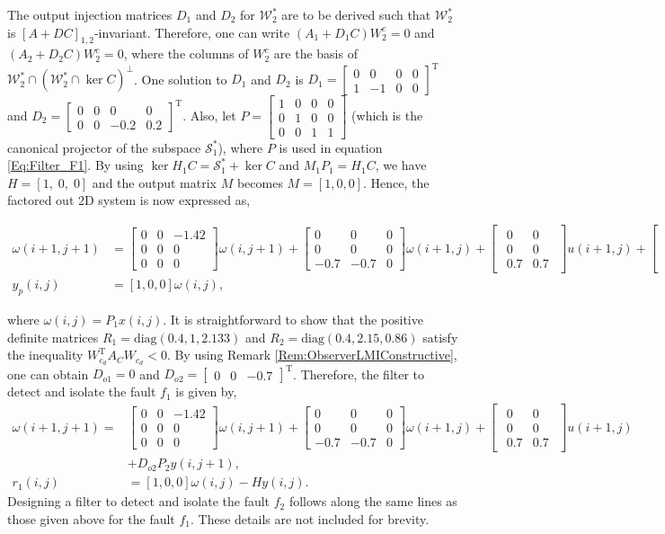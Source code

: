 \documentclass[journal,12pt,draftcls,onecolumn]{IEEEtran}
\newcommand{\tran}{\mathrm{T}}
\newcommand{\bsm}{\begin{smallmatrix}}
\newcommand{\esm}{\end{smallmatrix}}
\newcommand{\bbm}{\begin{bmatrix}}
\newcommand{\ebm}{\end{bmatrix}}
\newcommand{\bs}{\begin{small}}
\newcommand{\es}{\end{small}}
\newcommand{\diag}{\mathrm{diag}}
\newcommand{\ssp}[1]{\mathscr{#1}}      \newcommand{\setssp}[1]{\mathfrak{#1}}   \newcommand{\fld}[1]{\mathbb{#1}}       \newcommand{\op}[1]{\mathcal{#1}}       \newcommand{\sumbanach}[1]{\sum{#1}}
\begin{document}
The output injection matrices $D_1$ and $D_2$ for $\mathscr{W}_{2}^{*}$ are to be derived such that $\mathscr{W}_{2}^{*}$ is $[A+DC]_{1,2}$-invariant. Therefore, one can write
$(A_1+D_1C) W_{2}^{c}= 0$ and $(A_2+D_2C) W_{2}^{c}= 0$, where the columns of $W_{2}^{c}$ are the basis of $\ssp{W}_{2}^*\cap(\ssp{W}_{2}^*\cap\ker C)^\bot$. One solution to $D_1$  and $D_2$ is $D_1=\bbm 0 &0 &0 &0\\1 &-1 &0&0\ebm^\tran$ and $D_2 = \bbm 0 &0 &0 &0\\0 &0 &-0.2&0.2\ebm^\tran$. 
Also, let $P=\bbm 1 &0 &0 &0\\ 0 &1 &0 &0\\ 0 &0 &1 &1\ebm$ (which is the canonical projector of the subspace $\op{S}_1^{*}$), where $P$ is used in equation \eqref{Eq:Filter_F1}. By using $\ker H_1C=\op{S}_1^*+\ker C$ and $M_1P_1=H_1C$, we have $H=[1,\;0,\;0]$ and the output matrix $M$ becomes $M=[1,0,0]$.  Hence, the factored out 2D system is now expressed as,
\bs
\begin{equation*}\label{Eq:SimQuSubSys}
\begin{split}
\omega(i+1,j+1) &= \left[ \bsm 0 &0 &-1.42\\ 0 &0 &0\\0 &0 &0\esm\right] \omega(i,j+1) + \left[ \bsm 0 &0 &0\\0 &0 &0\\ -0.7 &-0.7 &0\esm\right] \omega(i+1,j) + \bbm \bsm 0 &0\\0 &0\\0.7 &0.7\esm \ebm u(i+1,j) + \bbm\bsm 0\\1\\0\esm\ebm f_1(i+1,j),\\
y_p(i,j) &= [1,0,0]\omega(i,j),
\end{split}
\end{equation*}
\es
where $\omega(i,j) = P_1 x(i,j)$. It is straightforward to show that the positive definite matrices  $R_1 = \diag(0.4, 1, 2.133)$ and $R_2 = \diag(0.4, 2.15, 0.86)$ satisfy the inequality  $W_{c_d}^\tran A_C W_{c_d}<0$. By using Remark \ref{Rem:ObserverLMIConstructive}, one can obtain $D_{o1}=0$ and $D_{o2} = \bbm 0 &0 &-0.7\ebm^\tran$. Therefore, the filter to detect and isolate the fault $f_1$ is given by,
\begin{equation*}\label{Eq:SimQuSubSys2}
\begin{split}
\omega(i+1,j+1) = &\left[ \bsm 0 &0 &-1.42\\ 0 &0 &0\\0 &0 &0\esm\right] \omega(i,j+1) + \left[ \bsm 0 &0 &0\\0 &0 &0\\ -0.7 &-0.7 &0\esm\right] \omega(i+1,j) + \bbm \bsm 0 &0\\0 &0\\0.7 &0.7\esm \ebm u(i+1,j) \\ &+ D_{o2}P_2y(i,j+1),\\
r_1(i,j) &= [1,0,0]\omega(i,j)-Hy(i,j).
\end{split}
\end{equation*}
Designing a filter to detect and isolate the fault $f_2$ follows  along  the same lines as those given above for the fault $f_1$. These details are not included for brevity. 
\end{document}
